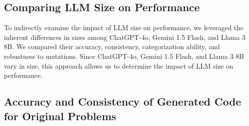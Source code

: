 \documentclass[times, 10pt,twocolumn]{article}
\begin{document}
\subsection{Comparing LLM Size on Performance}
To indirectly examine the impact of LLM size on performance, we leveraged the inherent differences in sizes among ChatGPT-4o, Gemini 1.5 Flash, and Llama 3 8B. We compared their accuracy, consistency, categorization ability, and robustness to mutations. Since ChatGPT-4o, Gemini 1.5 Flash, and Llama 3 8B vary in size, this approach allows us to determine the impact of LLM size on performance.


\subsection{Accuracy and Consistency of Generated Code for Original Problems}
\end{document}
